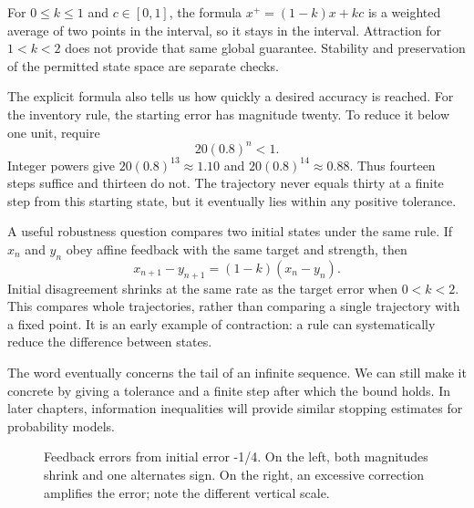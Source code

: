 \documentclass[11pt,oneside,openany]{book}
\theoremstyle{definition}
\theoremstyle{remark}
\numberwithin{equation}{chapter}
\begin{document}
For \(0\leq k\leq1\) and \(c\in[0,1]\), the formula \(x^+=(1-k)x+kc\) is a weighted average of two points in the interval, so it stays in the interval. Attraction for \(1<k<2\) does not provide that same global guarantee. Stability and preservation of the permitted state space are separate checks.

The explicit formula also tells us how quickly a desired accuracy is reached. For the inventory rule, the starting error has magnitude twenty. To reduce it below one unit, require \[20(0.8)^n<1.\] Integer powers give \(20(0.8)^{13}\approx1.10\) and \(20(0.8)^{14}\approx0.88\). Thus fourteen steps suffice and thirteen do not. The trajectory never equals thirty at a finite step from this starting state, but it eventually lies within any positive tolerance.

A useful robustness question compares two initial states under the same rule. If \(x_n\) and \(y_n\) obey affine feedback with the same target and strength, then \[x_{n+1}-y_{n+1}=(1-k)(x_n-y_n).\] Initial disagreement shrinks at the same rate as the target error when \(0<k<2\). This compares whole trajectories, rather than comparing a single trajectory with a fixed point. It is an early example of contraction: a rule can systematically reduce the difference between states.

The word eventually concerns the tail of an infinite sequence. We can still make it concrete by giving a tolerance and a finite step after which the bound holds. In later chapters, information inequalities will provide similar stopping estimates for probability models.

\begin{figure}[htbp]\centering
{}
\caption{Feedback errors from initial error -1/4. On the left, both magnitudes shrink and one alternates sign. On the right, an excessive correction amplifies the error; note the different vertical scale.}\end{figure}
\end{document}
